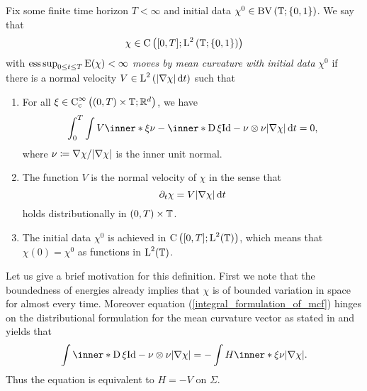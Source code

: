 \begin{definition}
	\label{motion_by_mcv}
	Fix some finite time horizon $ T < \infty $ and initial data $ \chi^{ 0 
	}\in \operatorname{BV} \left( \operatorname{\mathbb{T}} ; \{ 0 , 1 \} \right) $. We say that 
	\begin{equation*}
		\chi \in 
		\operatorname{C} \left(
		[ 0 , T ] ; \operatorname{L}^{ 2 } \left( \operatorname{\mathbb{T}} ; \{ 0 , 1 \}  \right)
		\right)
	\end{equation*}
	with $ \operatorname*{ess\,sup}_{ 0 \leq t \leq T } \operatorname{E} ( \chi ) < \infty $ \emph{moves 
	by mean 
	curvature with initial data } $ \chi^{ 0 } $ if there is a normal velocity
	$ V \in \operatorname{L}^{ 2 } \left( \abs{ \nabla \chi } \dd{ t } \right) $ such that 
	\begin{enumerate}
		\item 
		For all 
		$ \xi \in \operatorname{C}_{ \mathrm{ c } }^{ \infty } \left( ( 0 , T ) \times 
		\operatorname{\mathbb{T}} ; \mathbb{ R }^{ d } \right) $,
		we have
		\begin{equation}
			\label{integral_formulation_of_mcf}
			\int_{ 0 }^{ T }
			\int
			V \inner*{ \xi }{ \nu }
			- 
			\inner*{ \diff \xi }{ \mathrm{ Id } - \nu \otimes \nu }
			\abs{ \nabla \chi }
			\dd{ t }
			=
			0,
		\end{equation}
		where $ \nu \coloneqq \nabla \chi / \abs{ \nabla \chi } $ is the inner 
		unit normal.
		\item 
		The function $ V $ is the normal velocity of $ \chi $ in the sense that 
		\begin{equation*}
			\partial_{ t } \chi
			=
			V
			\abs{ \nabla \chi }
			\dd{ t }
		\end{equation*}
		holds distributionally in $ ( 0 , T ) \times \operatorname{\mathbb{T}} $.
		\item 
		The initial data $ \chi^{ 0 } $ is achieved in $ \operatorname{C} \left( [ 0 , T ] 
		; \operatorname{L}^{  2 } ( \operatorname{\mathbb{T}} ) \right) $, which means that $ \chi ( 
		0 ) = \chi^{ 0 } $ as functions in $ \operatorname{L}^{ 2 } ( \operatorname{\mathbb{T}} ) $.
	\end{enumerate}
\end{definition}

Let us give a brief motivation for this definition. First we note that the 
boundedness of energies already implies that $ \chi $ is of bounded variation 
in space for almost every time. Moreover equation 
(\ref{integral_formulation_of_mcf}) hinges on the distributional formulation 
for the mean curvature vector as stated in 
\cite{maggi_sets_of_finite_perimeter} and yields that
\begin{equation*}
	\int
		\inner*{ \diff \xi }{ \mathrm{Id} - \nu \otimes \nu }
	\abs{ \nabla \chi }
	=
	-
	\int
		H \inner*{ \xi }{ \nu }
	\abs{ \nabla \chi }.
\end{equation*}
Thus the equation is equivalent to $ H = - V $ on $ \Sigma $.


